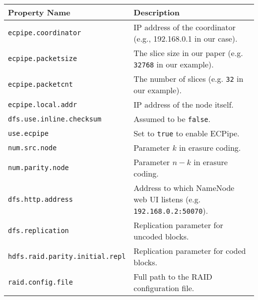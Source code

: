 \documentclass[letterpaper,12pt]{article}
\newcommand{\sysname}{{\sf\small ECPipe}\xspace}
\begin{document}
\begin{itemize}

\begin{table}[!ht]
\centering
\renewcommand{\arraystretch}{1.1}
\small
\begin{tabular}{|p{2.5in}|p{3in}|}
\hline
{\bf Property Name} & {\bf Description} \\
\hline
{\tt ecpipe.coordinator} & IP address of the coordinator (e.g., 192.168.0.1 in
our case).  \\
\hline
{\tt ecpipe.packetsize} & The slice size in our paper (e.g. {\tt 32768} in our example).  \\
\hline
{\tt ecpipe.packetcnt} & The number of slices (e.g. {\tt 32} in our example). \\
\hline
{\tt ecpipe.local.addr} & IP address of the node itself. \\
\hline
{\tt dfs.use.inline.checksum} & Assumed to be {\tt false}.\\
\hline
{\tt use.ecpipe} & Set to {\tt true} to enable \sysname.\\
\hline
{\tt num.src.node} & Parameter $k$ in erasure coding.\\
\hline
{\tt num.parity.node} & Parameter $n-k$ in erasure coding.\\
\hline
{\tt dfs.http.address} & Address to which NameNode web UI listens
(e.g. {\tt 192.168.0.2:50070}).\\
\hline
{\tt dfs.replication} & Replication parameter for uncoded blocks.\\
\hline
{\tt hdfs.raid.parity.initial.repl} & Replication parameter for coded blocks.\\
\hline
{\tt raid.config.file} & Full path to the RAID configuration file.\\

\end{tabular}
\end{table}
\end{itemize}
\end{document}
